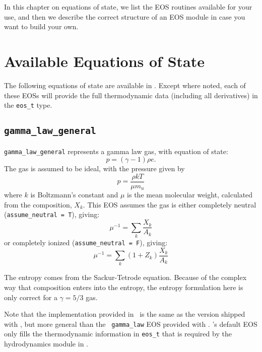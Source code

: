 
In this chapter on equations of state, we list the EOS routines
available for your use, and then we describe the correct structure of
an EOS module in case you want to build your own.

\section{Available Equations of State}

The following equations of state are available in \microphysics.
Except where noted, each of these EOSs will provide the full
thermodynamic data (including all derivatives) in the {\tt eos\_t}
type.



\subsection {\tt gamma\_law\_general} 

{\tt gamma\_law\_general} represents a gamma law gas, with
  equation of state:
\begin{equation}
  p = (\gamma - 1) \rho e.
\end{equation}
The gas is assumed to be ideal, with the pressure given by 
\begin{equation}
p = \frac{\rho k T}{\mu m_u}
\end{equation}
where $k$ is Boltzmann's constant and $\mu$ is the mean molecular
weight, calculated from the composition, $X_k$.  This EOS assumes
the gas is either completely neutral ({\tt assume\_neutral = T}),
giving:
\begin{equation}
\mu^{-1} = \sum_k \frac{X_k}{A_k}
\end{equation}
or completely ionized ({\tt assume\_neutral = F}), giving:
\begin{equation}
\mu^{-1} = \sum_k \left ( 1 + Z_k \right ) \frac{X_k}{A_k}
\end{equation}

The entropy comes from the Sackur-Tetrode equation.  Because of the
complex way that composition enters into the entropy, the entropy
formulation here is only correct for a $\gamma = 5/3$ gas.

Note that the implementation provided in \microphysics\ is the same as
the version shipped with \maestro, but more general than the {\tt
  gamma\_law} EOS provided with \castro.  \castro's default EOS only
fills the thermodynamic information in {\tt eos\_t} that is required
by the hydrodynamics module in \castro.



